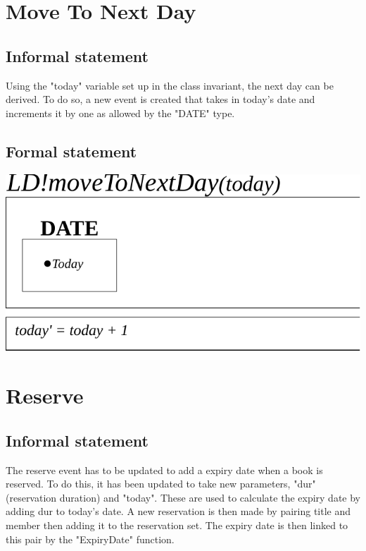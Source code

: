 \documentclass[]{report}
\begin{document}
\section{Move To Next Day}
\subsection{Informal statement}
Using the "today" variable set up in the class invariant, the next day can be derived. To do so, a new event is created that takes in today's date and increments it by one as allowed by the "DATE" type.
\subsection{Formal statement}
\begin{center}
	\includegraphics{move_to_next_day.pdf}
\end{center}
\newpage
\section{Reserve}
\subsection{Informal statement}
The reserve event has to be updated to add a expiry date when a book is reserved. To do this, it has been updated to take new parameters, "dur" (reservation duration) and "today". These are used to calculate the expiry date by adding dur to today's date. A new reservation is then made by pairing title and member then adding it to the reservation set. The expiry date is then linked to this pair by the "ExpiryDate" function.
\end{document}
